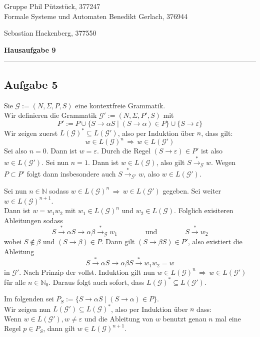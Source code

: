 \documentclass[a4paper,graphics,11pt]{article}
\newcommand{\aufgabe}[1]{\subsection*{Aufgabe #1}}
\begin{document}
\noindent Gruppe              \hfill Phil Pützstück, 377247\\
\noindent Formale Systeme und Automaten \hfill Benedikt Gerlach, 376944\\
\strut\hfill Sebastian Hackenberg, 377550\\
\begin{center}
	\LARGE{\textbf{Hausaufgabe 9}}
\end{center}
\begin{center}
\rule[0.1ex]{\textwidth}{1pt}
\end{center}

\aufgabe{5}
Sie $\mathcal{G} := (N, \Sigma, P, S)$ eine kontextfreie Grammatik.\\
Wir definieren die Grammatik $\mathcal{G}' := (N, \Sigma, P', S)$ mit
$$
    P' := P \cup \{S \to \alpha S \mid (S \to \alpha) \in P\} \cup \{S \to \varepsilon\}
$$
Wir zeigen zuerst $L(\mathcal{G})^* \subseteq L(\mathcal{G}')$, also per Induktion über $n$, dass gilt:
$$
    w \in L(\mathcal{G})^n \,\Longrightarrow\, w \in L(\mathcal{G}')
$$
Sei also $n = 0$. Dann ist $w = \varepsilon$. Durch die Regel $(S \to \varepsilon) \in P'$ ist also
$w \in L(\mathcal{G}')$.
Sei nun $n = 1$. Dann ist $w \in L(\mathcal{G})$, also gilt $S \overset{*}{\to}_\mathcal{G} w$.
Wegen $P \subset P'$ folgt dann insbesondere auch $S \overset{*}{\to}_{\mathcal{G}'} w$, also
$w \in L(\mathcal{G}')$.

Sei nun $n \in \mathbb{N}$ sodass $w \in L(\mathcal{G})^n \,\Longrightarrow\, w \in L(\mathcal{G}')$ gegeben.
Sei weiter $w \in L(\mathcal{G})^{n+1}$.\\
Dann ist $w = w_1w_2$ mit $w_1 \in L(\mathcal{G})^n$ und $w_2 \in L(\mathcal{G})$.
Folglich exisiteren Ableitungen sodass
$$
    S \overset{*}{\to} \alpha S \to \alpha\beta \overset{*}{\to}_\mathcal{G} w_1
    \qquad\qquad\text{und}\qquad\qquad
    S \overset{*}{\to} w_2
$$
wobei $S \notin \beta$ und $(S \to \beta) \in P$. Dann gilt $(S \to \beta S) \in P'$, also existiert die Ableitung
$$
    S \overset{*}{\to} \alpha S \to \alpha \beta S \overset{*}{\to} w_1w_2 = w
$$
in $\mathcal{G}'$. Nach Prinzip der vollst. Induktion gilt nun $w \in L(\mathcal{G})^n \,\Longrightarrow\, w\in L(\mathcal{G}')$ für alle $n \in \mathbb{N}_0$.
Daraus folgt auch sofort, dass $L(\mathcal{G})^* \subseteq L(\mathcal{G}')$.

Im folgenden sei $P_S := \{S \to \alpha S \mid (S \to \alpha) \in P\}$.\\
Wir zeigen nun $L(\mathcal{G}') \subseteq L(\mathcal{G})^*$, also per Induktion über $n$ dass:\\
Wenn $w \in L(\mathcal{G}'), w \neq \varepsilon$ und die Ableitung von $w$ benutzt genau $n$ mal eine Regel $p \in P_S$,
dann gilt $w \in L(\mathcal{G})^{n+1}$.
\end{document}

